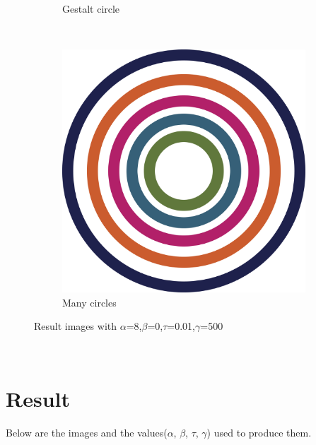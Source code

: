 \documentclass[paper=a4, fontsize=11pt]{scrartcl} %
\numberwithin{equation}{section} %
\numberwithin{figure}{section} %
\numberwithin{table}{section} %
\begin{document}
\begin{figure}[H]
\begin{subfigure}[b]{0.2\textwidth}
                \caption{Gestalt circle}
                \label{fig:Gestaltcircle}
        \end{subfigure}
        ~ %
        \begin{subfigure}[b]{0.2\textwidth}
                \includegraphics[width=\textwidth]{circles}
                \caption{Many circles}
                \label{fig:Manycircles}
        \end{subfigure}
        \caption{Result images with $\alpha$=8,$\beta$=0,$\tau$=0.01,$\gamma$=500}\label{fig:resultimages}
\end{figure}
\

\section{Result}
Below are the images and the values($\alpha$, $\beta$, $\tau$, $\gamma$) used to produce them.\\
\end{document}

